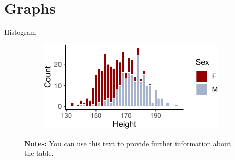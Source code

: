 \documentclass[11pt, aspectratio=169, t]{beamer}
\begin{document}
\hypertarget{graphs}{%
\section{Graphs}\label{graphs}}

\begin{frame}{Histogram}
\protect\hypertarget{histogram}{}
\begin{figure}

\caption{\label{fig-hist}Distribution of height (in cm) in random data}

{\centering 

\begin{figure}[H]

{\centering \includegraphics{example_slides_files/figure-beamer/Histogram-1.pdf}

}

\end{figure}

\hypertarget{fig-hist-1}{}
\vspace{-5pt}
\begin{minipage}{0.9\textwidth}
\scriptsize
\singlespacing
\textbf{Notes:} You can use this text to provide further information about the table. \lipsum[66]
\end{minipage}
\vspace{15pt}

}

\end{figure}
\end{frame}
\end{document}
